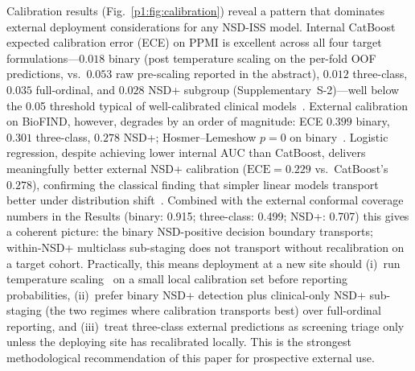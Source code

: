 \documentclass[10pt,letterpaper]{article}
\begin{document}
Calibration results (Fig.~\ref{p1:fig:calibration}) reveal a pattern that dominates external deployment considerations for any NSD-ISS model. Internal CatBoost expected calibration error (ECE) on PPMI is excellent across all four target formulations---$0.018$ binary (post temperature scaling on the per-fold OOF predictions, vs.\ $0.053$ raw pre-scaling reported in the abstract), $0.012$ three-class, $0.035$ full-ordinal, and $0.028$ NSD+ subgroup (Supplementary~S-2)---well below the 0.05 threshold typical of well-calibrated clinical models~\cite{guo2017calibration}. External calibration on BioFIND, however, degrades by an order of magnitude: ECE $0.399$ binary, $0.301$ three-class, $0.278$ NSD+; Hosmer--Lemeshow $p{=}0$ on binary~\cite{naeini2015ece}. Logistic regression, despite achieving lower internal AUC than CatBoost, delivers meaningfully better external NSD+ calibration ($\mathrm{ECE}{=}0.229$ vs.\ CatBoost's $0.278$), confirming the classical finding that simpler linear models transport better under distribution shift~\cite{austin2020graphical}. Combined with the external conformal coverage numbers in the Results (binary: 0.915; three-class: 0.499; NSD+: 0.707) this gives a coherent picture: the binary NSD-positive decision boundary transports; within-NSD+ multiclass sub-staging does not transport without recalibration on a target cohort. Practically, this means deployment at a new site should (i)~run temperature scaling~\cite{guo2017calibration} on a small local calibration set before reporting probabilities, (ii)~prefer binary NSD+ detection plus clinical-only NSD+ sub-staging (the two regimes where calibration transports best) over full-ordinal reporting, and (iii)~treat three-class external predictions as screening triage only unless the deploying site has recalibrated locally. This is the strongest methodological recommendation of this paper for prospective external use.
\end{document}
